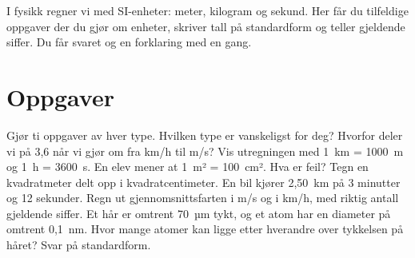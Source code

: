 \documentclass[11pt]{article}
\begin{document}

I fysikk regner vi med SI-enheter: meter, kilogram og sekund. Her får du tilfeldige oppgaver der du gjør om enheter, skriver tall på standardform og teller gjeldende siffer. Du får svaret og en forklaring med en gang.

\section*{Oppgaver}

\begin{oppgaveliste}
\oppgave {}Gjør ti oppgaver av hver type. Hvilken type er vanskeligst for deg?
\svar
\oppgave {}Hvorfor deler vi på 3,6 når vi gjør om fra km/h til m/s? Vis utregningen med 1~km = 1000~m og 1~h = 3600~s.
\svar
\oppgave {}En elev mener at 1~m² = 100~cm². Hva er feil? Tegn en kvadratmeter delt opp i kvadratcentimeter.
\svar
\oppgave {}En bil kjører 2,50~km på 3 minutter og 12 sekunder. Regn ut gjennomsnittsfarten i m/s og i km/h, med riktig antall gjeldende siffer.
\svar
\oppgave {}Et hår er omtrent 70~µm tykt, og et atom har en diameter på omtrent 0,1~nm. Hvor mange atomer kan ligge etter hverandre over tykkelsen på håret? Svar på standardform.
\svar
\end{oppgaveliste}
\end{document}
